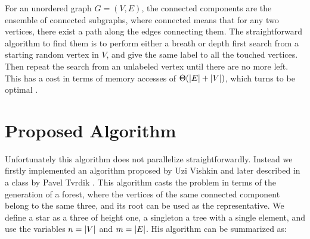 %

For an unordered graph $G=(V,E)$, the connected components are the ensemble
of connected subgraphs, where connected means that for any two  vertices, there exist a path along the
 edges connecting them.
The straightforward algorithm to find them is to perform either a breath or depth first search from a starting
random vertex in $V$, and give the same label to all the touched vertices. Then repeat the search from an unlabeled vertex
until there are no more left.
This has a cost in terms of memory accesses of $\Theta(\left| E \right| + \left| V \right|)$, which turns to be optimal \cite{Hopcroft}.

\section{Proposed Algorithm}\label{sec:yourmethod}
%
%

Unfortunately this algorithm does not parallelize straightforwardly. Instead we firstly implemented
an algorithm proposed by Uzi Vishkin \cite{PCompArticle} and later described in a class by
Pavel Tvrdik \cite{PCompClass}. This algorithm casts the problem in terms of the generation of a
forest, where the vertices of the same connected component belong to the same three, and its root
can be used as the representative. We define a star as a three of height one, a singleton a tree
with a single element, and use the variables $n=\left| V \right|$ and $m=\left| E \right|$.
His algorithm can be summarized as:

